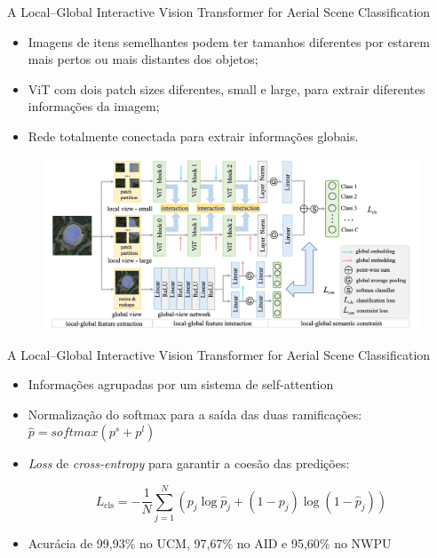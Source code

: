 
\begin{frame}{A Local–Global Interactive Vision Transformer for Aerial Scene Classification}

    \begin{itemize}
        \item Imagens de itens semelhantes podem ter tamanhos diferentes por estarem mais pertos ou mais distantes dos objetos;

        \item ViT com dois patch sizes diferentes, small e large, para extrair diferentes informações da imagem;

        \item Rede totalmente conectada para extrair informações globais.
    \end{itemize}

    \begin{figure}
        \centering
        \includegraphics[width=0.5\linewidth]{TrabalhosRelacionados/A_LocalGlobal_Model.png}

    \end{figure}
\end{frame}

\begin{frame}{A Local–Global Interactive Vision Transformer for Aerial Scene Classification}
    \begin{itemize}
        \item Informações agrupadas por um sistema de self-attention

        \item Normalização do softmax para a saída das duas ramificações: \(\hat{p} = softmax(p^{s}+p^{l})\)

        \item \textit{Loss} de \textit{cross-entropy} para garantir a coesão das predições:

        \[L_{\text{cls}} = -\frac{1}{N} \sum_{j=1}^{N} \left( p_j \log \hat{p}_j + (1 - p_j) \log(1 - \hat{p}_j) \right) \]

        \item Acurácia de 99,93\% no UCM, 97,67\% no AID e 95,60\% no NWPU
        
        
    \end{itemize}
\end{frame}

